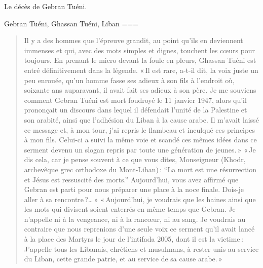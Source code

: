 Le décès de Gebran Tuéni.

Gebran Tuéni, Ghassan Tuéni, Liban
===
\begin{quote}
    Il y a des hommes que l’épreuve grandit, au point qu’ils en deviennent immenses et qui, avec des mots simples et dignes, touchent les cœurs pour toujours. En prenant le micro devant la foule en pleurs, Ghassan Tuéni est entré définitivement dans la légende. « Il est rare, a-t-il dit, la voix juste un peu enrouée, qu’un homme fasse ses adieux à son fils à l’endroit où, soixante ans auparavant, il avait fait ses adieux à son père. Je me souviens comment Gebran Tuéni est mort foudroyé le 11 janvier 1947, alors qu’il prononçait un discours dans lequel il défendait l’unité de la Palestine et son arabité, ainsi que l’adhésion du Liban à la cause arabe. Il m’avait laissé ce message et, à mon tour, j’ai repris le flambeau et inculqué ces principes à mon fils. Celui-ci a suivi la même voie et scandé ces mêmes idées dans ce serment devenu un slogan repris par toute une génération de jeunes. » « Je dis cela, car je pense souvent à ce que vous dites, Monseigneur (Khodr, archevêque grec orthodoxe du Mont-Liban) : “La mort est une résurrection et Jésus est ressuscité des morts.” Aujourd’hui, vous avez affirmé que Gebran est parti pour nous préparer une place à la noce finale. Dois-je aller à sa rencontre ?… » « Aujourd’hui, je voudrais que les haines ainsi que les mots qui divisent soient enterrés en même temps que Gebran. Je n’appelle ni à la vengeance, ni à la rancœur, ni au sang. Je voudrais au contraire que nous reprenions d’une seule voix ce serment qu’il avait lancé à la place des Martyrs le jour de l’intifada 2005, dont il est la victime : J’appelle tous les Libanais, chrétiens et musulmans, à rester unis au service du Liban, cette grande patrie, et au service de sa cause arabe. »
\end{quote}
\nocite{2005b}

